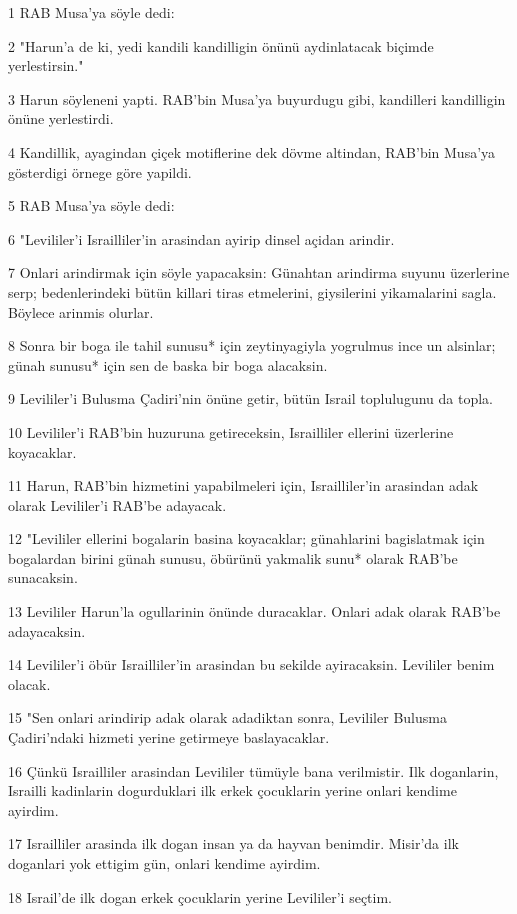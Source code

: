 \par 1 RAB Musa'ya söyle dedi:
\par 2 "Harun'a de ki, yedi kandili kandilligin önünü aydinlatacak biçimde yerlestirsin."
\par 3 Harun söyleneni yapti. RAB'bin Musa'ya buyurdugu gibi, kandilleri kandilligin önüne yerlestirdi.
\par 4 Kandillik, ayagindan çiçek motiflerine dek dövme altindan, RAB'bin Musa'ya gösterdigi örnege göre yapildi.
\par 5 RAB Musa'ya söyle dedi:
\par 6 "Levililer'i Israilliler'in arasindan ayirip dinsel açidan arindir.
\par 7 Onlari arindirmak için söyle yapacaksin: Günahtan arindirma suyunu üzerlerine serp; bedenlerindeki bütün killari tiras etmelerini, giysilerini yikamalarini sagla. Böylece arinmis olurlar.
\par 8 Sonra bir boga ile tahil sunusu* için zeytinyagiyla yogrulmus ince un alsinlar; günah sunusu* için sen de baska bir boga alacaksin.
\par 9 Levililer'i Bulusma Çadiri'nin önüne getir, bütün Israil toplulugunu da topla.
\par 10 Levililer'i RAB'bin huzuruna getireceksin, Israilliler ellerini üzerlerine koyacaklar.
\par 11 Harun, RAB'bin hizmetini yapabilmeleri için, Israilliler'in arasindan adak olarak Levililer'i RAB'be adayacak.
\par 12 "Levililer ellerini bogalarin basina koyacaklar; günahlarini bagislatmak için bogalardan birini günah sunusu, öbürünü yakmalik sunu* olarak RAB'be sunacaksin.
\par 13 Levililer Harun'la ogullarinin önünde duracaklar. Onlari adak olarak RAB'be adayacaksin.
\par 14 Levililer'i öbür Israilliler'in arasindan bu sekilde ayiracaksin. Levililer benim olacak.
\par 15 "Sen onlari arindirip adak olarak adadiktan sonra, Levililer Bulusma Çadiri'ndaki hizmeti yerine getirmeye baslayacaklar.
\par 16 Çünkü Israilliler arasindan Levililer tümüyle bana verilmistir. Ilk doganlarin, Israilli kadinlarin dogurduklari ilk erkek çocuklarin yerine onlari kendime ayirdim.
\par 17 Israilliler arasinda ilk dogan insan ya da hayvan benimdir. Misir'da ilk doganlari yok ettigim gün, onlari kendime ayirdim.
\par 18 Israil'de ilk dogan erkek çocuklarin yerine Levililer'i seçtim.
